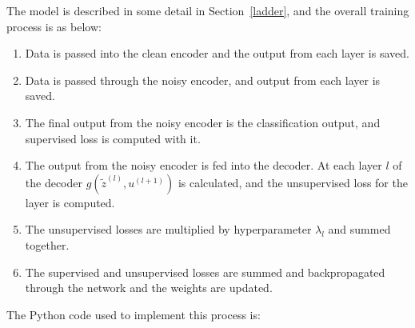 The model is described in some detail in Section~\ref{ladder}, and the overall training process is as below: 
\begin{enumerate}
    \item Data is passed into the clean encoder and the output from each layer is saved.
    \item Data is passed through the noisy encoder, and output from each layer is saved.
    \item The final output from the noisy encoder is the classification output, and supervised loss is computed with it.
    \item The output from the noisy encoder is fed into the decoder. At each layer $l$ of the decoder $g(\tilde{z}^{(l)}, u^{(l+1)})$ is calculated,
          and the unsupervised loss for the layer is computed.
    \item The unsupervised losses are multiplied by hyperparameter $\lambda_{l}$ and summed together.
    \item The supervised and unsupervised losses are summed and backpropagated through the network and the weights are updated.
\end{enumerate}

The Python code used to implement this process is:

